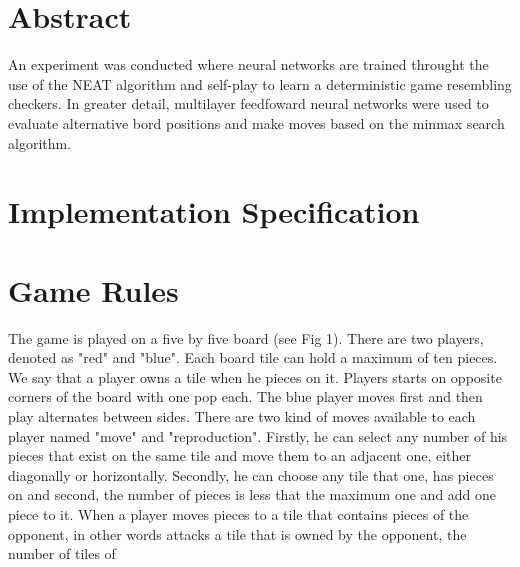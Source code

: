 \documentclass[12pt]{article}
\begin{document}
\section*{Abstract}

An experiment was conducted where neural networks are trained throught the use of the 
NEAT algorithm and self-play to learn a deterministic game resembling checkers. In 
greater detail, multilayer feedfoward neural networks were used to evaluate alternative
bord positions and make moves based on the minmax search algorithm.

\section*{Implementation Specification}

\section*{Game Rules}

The game is played on a five by five board (see Fig 1). There are two players, denoted
as "red" and "blue". Each board tile can hold a maximum of ten pieces. We say that a 
player owns a tile when he pieces on it. Players starts on opposite corners of the 
board with one pop each. The blue player moves first and then play alternates between 
sides. There are two kind of moves available to each player named "move" and "reproduction". Firstly, he can select 
any number of his pieces that exist on the same tile and move them to an adjacent one, 
either diagonally or horizontally. Secondly, he can choose any tile that one, has pieces
on and second, the number of pieces is less that the maximum one and add one piece to it.
When a player moves pieces to a tile that contains pieces of the opponent, in other words attacks a tile that is owned
by the opponent, the number of tiles
of 
\end{document}
